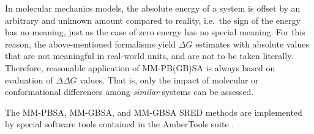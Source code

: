 In molecular mechanics models, the absolute energy of a system is offset by an
arbitrary and unknown amount compared to reality, i.e.\ the sign of the energy
has no meaning, just as the case of zero energy has no special meaning. For this
reason, the above-mentioned formalisms yield $\Delta G$ estimates with absolute
values that are not meaningful in real-world units, and are not to be taken
literally. Therefore, reasonable application of MM-PB(GB)SA is always based on
evaluation of $\Delta \Delta G$ values. That is, only the impact of molecular or
conformational differences among \textit{similar} systems can be assessed.

The MM-PBSA, MM-GBSA, and MM-GBSA SRED methods are implemented by special
software tools contained in the AmberTools suite \cite{mmpbsa_py_2012}.
